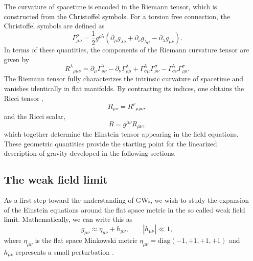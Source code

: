 The curvature of spacetime is encoded in the Riemann tensor, which is constructed
from the Christoffel symbols. For a torsion free connection, the Christoffel symbols
are defined as \cite{LlibreBertJanssen}
\begin{equation}
\Gamma^\rho_{\mu\nu}
=
\frac{1}{2} g^{\rho\lambda}
\left(
\partial_\mu g_{\lambda\nu}
+
\partial_\nu g_{\lambda\mu}
-
\partial_\lambda g_{\mu\nu}
\right).
\label{eq:christoffelsymbols}
\end{equation}
In terms of these quantities, the components of the Riemann curvature tensor are
given by
\begin{equation}
R^\lambda{}_{\rho\mu\nu}
=
\partial_\mu \Gamma^\lambda_{\rho\nu}
-
\partial_\nu \Gamma^\lambda_{\rho\mu}
+
\Gamma^\lambda_{\sigma\mu}\Gamma^\sigma_{\rho\nu}
-
\Gamma^\lambda_{\sigma\nu}\Gamma^\sigma_{\rho\mu}.
\label{eq:riemanntensor}
\end{equation}
The Riemann tensor fully characterizes the intrinsic curvature of spacetime and
vanishes identically in flat manifolds. By contracting its indices, one obtains the
Ricci tensor \cite{Llibre_Peter_Collier_unacosadificildecomprender},
\begin{equation}
R_{\mu\nu}
=
R^{\rho}{}_{\mu\rho\nu},
\end{equation}
and the Ricci scalar,
\begin{equation}
R
=
g^{\mu\nu} R_{\mu\nu},
\end{equation}
which together determine the Einstein tensor appearing in the field equations.
These geometric quantities provide the starting point for the linearized
description of gravity developed in the following sections.



\subsection{The weak field limit}



As a first step toward the understanding of GWs, we wish to study the expansion of the Einstein equations around the flat space metric in the so called weak field limit. Mathematically, we can write this as
\begin{equation}
g_{\mu\nu} \approx \eta_{\mu\nu} + h_{\mu\nu}, \qquad |h_{\mu\nu}| \ll 1,
\end{equation}
where $\eta_{\mu\nu}$ is the flat space Minkowski metric $\eta_{\mu\nu}= \mathrm{diag}(-1, +1, +1, +1)$ and $h_{\mu\nu}$ represents a small perturbation \cite{maggiore2007gravitational}.

